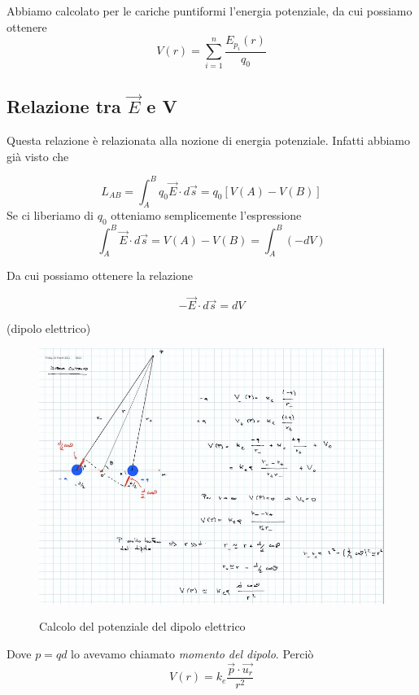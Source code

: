 \begin{esempio}
Abbiamo calcolato per le cariche puntiformi l'energia potenziale, da cui possiamo ottenere $$V(r)=\sum_{i=1}^{n} \dfrac{E_{p_i} (r)}{q_0}$$
\end{esempio}
\subsection{Relazione tra $\vec{E}$ e V}
Questa relazione è relazionata alla nozione di energia potenziale. Infatti abbiamo già visto che 

$$L_{AB}=\int_{A}^{B}q_0 \vec{E} \cdot d\vec{s}= q_0 \left[V(A)-V(B) \right] $$
Se ci liberiamo di $q_0$ otteniamo semplicemente l'espressione 
$$\int_{A}^{B}\vec{E} \cdot d\vec{s}= V(A)-V(B)= \int_{A}^{B}(-dV)$$

Da cui possiamo ottenere la relazione 

$$-\vec{E} \cdot d\vec{s}=  dV$$

\begin{esempio}(dipolo elettrico)
	
	\begin{figure}[h]
		\begin{center}
			\includegraphics[width=15cm]{lezione8/images/4 Elettrostatica, Il potenziale elettrico}\\
			\caption{Calcolo del potenziale del dipolo elettrico}
		\end{center}
	\end{figure}

Dove $p=qd$ lo avevamo chiamato \textit{momento del dipolo}. Perciò
$$V(r)=k_e \frac{\vec{p}\cdot \vec{u_r}}{r^2}$$
\end{esempio}


